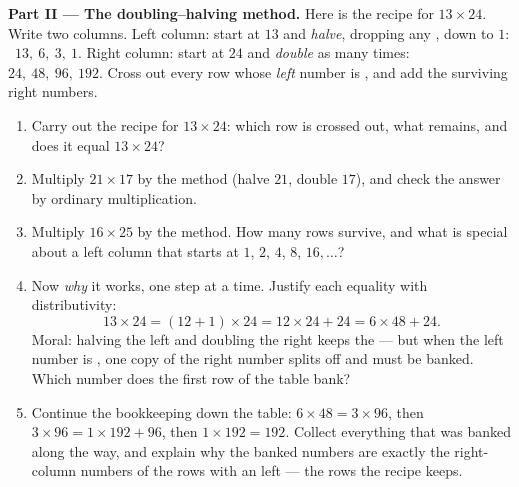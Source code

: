 \begin{problem}
\medskip
\noindent\textbf{Part II --- The doubling--halving method.}
Here is the recipe for $13 \times 24$. Write two columns. Left
column: start at $13$ and \emph{halve}, dropping any ,
down to $1$: \ $13,\ 6,\ 3,\ 1$. Right column: start at $24$ and
\emph{double} as many times: \ $24,\ 48,\ 96,\ 192$. Cross out
every row whose \emph{left} number is , and add the surviving
right numbers.
\begin{enumerate}[resume]
  \item Carry out the recipe for $13 \times 24$: which row is
        crossed out, what  remains, and does it equal
        $13 \times 24$?
  \item Multiply $21 \times 17$ by the method (halve $21$, double
        $17$), and check the answer by ordinary multiplication.
  \item Multiply $16 \times 25$ by the method. How many rows
        survive, and what is special about a left column that
        starts at $1$, $2$, $4$, $8$, $16, \dots$?
  \item Now \emph{why} it works, one step at a time. Justify each
        equality with distributivity:
        \[
        13 \times 24 = (12 + 1) \times 24
        = 12 \times 24 + 24 = 6 \times 48 + 24 .
        \]
        Moral: halving the left and doubling the right keeps the
         --- but when the left number is \emph{}, one
        copy of the right number splits off and must be banked.
        Which number does the first row of the table bank?
  \item Continue the bookkeeping down the table:
        $6 \times 48 = 3 \times 96$, then
        $3 \times 96 = 1 \times 192 + 96$, then
        $1 \times 192 = 192$. Collect everything that was banked
        along the way, and explain why the banked numbers are
        exactly the right-column numbers of the rows with an 
        left --- the rows the recipe keeps.
\end{enumerate}


\end{problem}
